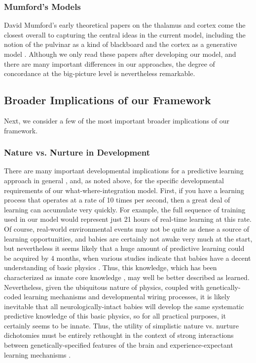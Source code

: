 \documentclass[11pt,twoside]{article}
\newif\myifpdf
\begin{document}
\subsubsection{Mumford's Models}

David Mumford's early theoretical papers on the thalamus and cortex come the closest overall to capturing the central ideas in the current model, including the notion of the pulvinar as a kind of blackboard \cite{Mumford91} and the cortex as a generative model \cite{Mumford92}.  Although we only read these papers after developing our model, and there are many important differences in our approaches, the degree of concordance at the big-picture level is nevertheless remarkable.

\subsection{Broader Implications of our Framework}

Next, we consider a few of the most important broader implications of our framework.

\subsubsection{Nature vs. Nurture in Development}

There are many important developmental implications for a predictive learning approach in general \cite[e.g.,]{ElmanBatesKarmiloff-SmithEtAl96,MunakataMcClellandJohnsonEtAl97}, and, as noted above, for the specific developmental requirements of our what-where-integration model.  First, if you have a learning process that operates at a rate of 10 times per second, then a great deal of learning can accumulate very quickly.  For example, the full sequence of training used in our model would represent just 21 hours of real-time learning at this rate.   Of course, real-world environmental events may not be quite as dense a source of learning opportunities, and babies are certainly not awake very much at the start, but nevertheless it seems likely that a huge amount of predictive learning could be acquired by 4 months, when various studies indicate that babies have a decent understanding of basic physics \cite[e.g.,]{Spelke94,KellmanSpelke83}.  Thus, this knowledge, which has been characterized as innate core knowledge \cite{Spelke94}, may well be better described as learned.  Nevertheless, given the ubiquitous nature of physics, coupled with genetically-coded learning mechanisms and developmental wiring processes, it is likely inevitable that all neurologically-intact babies will develop the same systematic predictive knowledge of this basic physics, so for all practical purposes, it certainly seems to be innate.  Thus, the utility of simplistic nature vs. nurture dichotomies must be entirely rethought in the context of strong interactions between genetically-specified features of the brain and experience-expectant learning mechanisms \cite[e.g.,]{ElmanBatesKarmiloff-SmithEtAl96,GreenoughBlackWallace87}.
\end{document}
